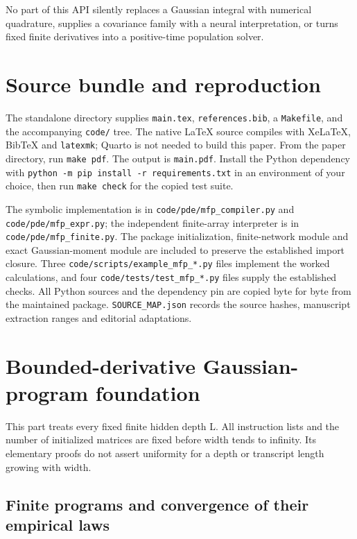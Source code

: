 \documentclass[
  11pt,
]{article}
\theoremstyle{definition}
\theoremstyle{plain}
\theoremstyle{plain}
\theoremstyle{plain}
\theoremstyle{remark}
\begin{document}
No part of this API silently replaces a Gaussian integral with numerical
quadrature, supplies a covariance family with a neural interpretation,
or turns fixed finite derivatives into a positive-time population
solver.

\section{Source bundle and reproduction}\label{sec-source-bundle}

The standalone directory supplies \texttt{main.tex},
\texttt{references.bib}, a \texttt{Makefile}, and the accompanying
\texttt{code/} tree. The native LaTeX source compiles with XeLaTeX,
BibTeX and \texttt{latexmk}; Quarto is not needed to build this paper.
From the paper directory, run \texttt{make\ pdf}. The output is
\texttt{main.pdf}. Install the Python dependency with
\texttt{python\ -m\ pip\ install\ -r\ requirements.txt} in an
environment of your choice, then run \texttt{make\ check} for the copied
test suite.

The symbolic implementation is in \texttt{code/pde/mfp\_compiler.py} and
\texttt{code/pde/mfp\_expr.py}; the independent finite-array interpreter
is in \texttt{code/pde/mfp\_finite.py}. The package initialization,
finite-network module and exact Gaussian-moment module are included to
preserve the established import closure. Three
\texttt{code/scripts/example\_mfp\_*.py} files implement the worked
calculations, and four \texttt{code/tests/test\_mfp\_*.py} files supply
the established checks. All Python sources and the dependency pin are
copied byte for byte from the maintained package.
\texttt{SOURCE\_MAP.json} records the source hashes, manuscript
extraction ranges and editorial adaptations.

\appendix

\section{Bounded-derivative Gaussian-program
foundation}\label{sec-docs-special-data-limits-l3785}

This part treats every fixed finite hidden depth L. All instruction
lists and the number of initialized matrices are fixed before width
tends to infinity. Its elementary proofs do not assert uniformity for a
depth or transcript length growing with width.

\subsection{Finite programs and convergence of their empirical
laws}\label{sec-docs-special-data-limits-l3789}
\end{document}
